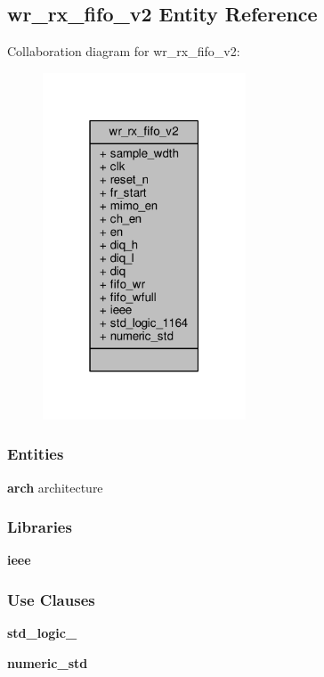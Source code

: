 \subsection{wr\+\_\+rx\+\_\+fifo\+\_\+v2 Entity Reference}
\label{classwr__rx__fifo__v2}


Collaboration diagram for wr\+\_\+rx\+\_\+fifo\+\_\+v2\+:\nopagebreak
\begin{figure}[H]
\begin{center}
\leavevmode
\includegraphics[width=171pt]{dc/d2f/classwr__rx__fifo__v2__coll__graph}
\end{center}
\end{figure}
\subsubsection*{Entities}
\begin{DoxyCompactItemize}
\item 
{\bf arch} architecture
\end{DoxyCompactItemize}
\subsubsection*{Libraries}
 \begin{DoxyCompactItemize}
\item 
{\bf ieee} 
\end{DoxyCompactItemize}
\subsubsection*{Use Clauses}
 \begin{DoxyCompactItemize}
\item 
{\bf std\+\_\+logic\+\_}   
\item 
{\bf numeric\+\_\+std}   
\end{DoxyCompactItemize}
